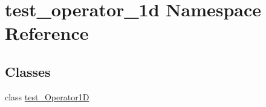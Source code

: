 \hypertarget{namespacetest__operator__1d}{}\section{test\+\_\+operator\+\_\+1d Namespace Reference}
\label{namespacetest__operator__1d}
\subsection*{Classes}
\begin{DoxyCompactItemize}
\item 
class \hyperlink{classtest__operator__1d_1_1test__Operator1D}{test\+\_\+\+Operator1D}
\end{DoxyCompactItemize}
